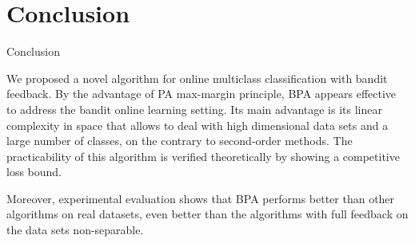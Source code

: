\documentclass[preprint,12pt,authoryear]{elsarticle}
\begin{document}
\section{Conclusion}
\label{sec:conclusion}
{Conclusion}
\label{subsec:BPAC}

We proposed a novel algorithm for online multiclass classification with bandit feedback. By the advantage of PA max-margin principle, BPA appears effective to address the bandit online learning setting. Its main advantage is its linear complexity in space that allows to deal with high dimensional data sets and a large number of classes, on the contrary to second-order methods. The practicability of this algorithm is verified theoretically by showing a competitive loss bound.

Moreover, experimental evaluation shows that BPA performs better than other algorithms on  real datasets, even better than the algorithms with full feedback on the data sets non-separable.




\end{document}
